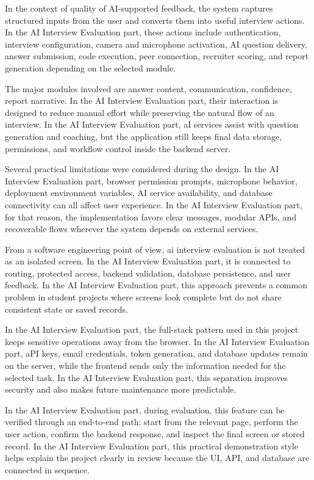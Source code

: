 \documentclass[12pt,a4paper]{report}
\begin{document}
In the context of quality of AI-supported feedback, the system captures structured inputs from the user and converts them into useful interview actions. In the AI Interview Evaluation part, these actions include authentication, interview configuration, camera and microphone activation, AI question delivery, answer submission, code execution, peer connection, recruiter scoring, and report generation depending on the selected module.


The major modules involved are answer content, communication, confidence, report narrative. In the AI Interview Evaluation part, their interaction is designed to reduce manual effort while preserving the natural flow of an interview. In the AI Interview Evaluation part, aI services assist with question generation and coaching, but the application still keeps final data storage, permissions, and workflow control inside the backend server.


Several practical limitations were considered during the design. In the AI Interview Evaluation part, browser permission prompts, microphone behavior, deployment environment variables, AI service availability, and database connectivity can all affect user experience. In the AI Interview Evaluation part, for that reason, the implementation favors clear messages, modular APIs, and recoverable flows wherever the system depends on external services.


From a software engineering point of view, ai interview evaluation is not treated as an isolated screen. In the AI Interview Evaluation part, it is connected to routing, protected access, backend validation, database persistence, and user feedback. In the AI Interview Evaluation part, this approach prevents a common problem in student projects where screens look complete but do not share consistent state or saved records.


In the AI Interview Evaluation part, the full-stack pattern used in this project keeps sensitive operations away from the browser. In the AI Interview Evaluation part, aPI keys, email credentials, token generation, and database updates remain on the server, while the frontend sends only the information needed for the selected task. In the AI Interview Evaluation part, this separation improves security and also makes future maintenance more predictable.


In the AI Interview Evaluation part, during evaluation, this feature can be verified through an end-to-end path: start from the relevant page, perform the user action, confirm the backend response, and inspect the final screen or stored record. In the AI Interview Evaluation part, this practical demonstration style helps explain the project clearly in review because the UI, API, and database are connected in sequence.
\end{document}
